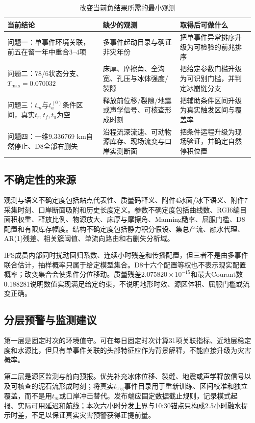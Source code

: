 \begin{table}[htbp]\centering\small
\caption{改变当前负结果所需的最小观测}\label{tab:what-would-change}
\begin{tabularx}{\textwidth}{Y Y Y}\toprule
当前结论&缺少的观测&取得后可做什么\\\midrule
问题一：单事件环境关联，前五在留一年中重合3--4项&多事件起动目录与确证非灾年份&把单事件异常排序升级为可检验的前兆排序\\
问题二：78/6状态分支、$T_{\max}=0.070032$&床厚、摩擦角、全沟宽、孔压与冰体强度/裂隙&把给定参数门槛升级为可识别门槛，并判定冰崩链分支\\
问题三：$t_m$与$t_a^{(0)}$条件区间，真实$t_r,t_f,t_a$为空&释放前位移/裂隙/地震或声学信号、可核查形成时刻&把辅助条件区间升级为真实触发区间与覆盖率\\
问题四：一维9.336769 km自然停止、D8全部右删失&沿程流深流速、可动物源库存、现场流变与口岸实测断面&把条件运程升级为现场验证，并确定自然停积位置\\
\bottomrule
\end{tabularx}\end{table}

\subsection{不确定性的来源}
观测与语义不确定度包括站点代表性、质量码释义、附件4冰面/冰下语义、附件7采集时刻、口岸断面吸附和历史长度定义。参数不确定度包括曲线数、RGI6编目面积权重、释放比例、物源放大、床厚与摩擦角、Manning糙率、屈服门槛、D8配置和有限库存幅度。结构不确定度包括静力积分假设、集总产流、融水代理、AR(1)残差、相关簇阈值、单流向路由和右删失分析域。

IFS成员内部同时扰动回归系数、连续小时残差和传播配置，但三者不是由多事件联合估计，抽样概率只属于给定模型集合\cite{beven1992}。D8十六个配置等权也不表示现实配置概率；改变集合会使条件分位移动。质量残差$2.075820\times10^{-15}$和最大Courant数0.188281说明数值实现满足给定约束，不说明地形时效、源区体积、屈服门槛或流变正确。

\subsection{分层预警与监测建议}
第一层是固定时次的环境值守。可在每日固定时次计算31项关联指标、近地层稳定度和水源比，但只有单事件关联的头部特征应作为背景解释，不能直接升级为灾害概率。

第二层是源区监测与前向预报。优先补充冰体位移、裂缝、地震或声学释放信号以及可核查的泥石流形成时刻；将真实$t_{\mathrm{trig}}$事件目录用于重新训练、区间校准和独立覆盖，而不是用$t_m$或口岸冲击替代。发布端应固定数据截止规则，记录模式起报、实际可用延迟和航线；本次六小时分发上界与10:30锚点只构成2.5小时融水提示时差，不足以保证真实灾害预警获得正提前量。


